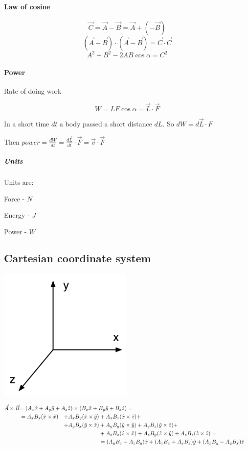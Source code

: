 \paragraph{Law of cosine}
\begin{center}	
	
\end{center}
$$\vec{C} = \vec{A} - \vec{B}=\vec{A} + (-\vec{B})$$
$$(\vec{A}-\vec{B}) \cdot (\vec{A}-\vec{B}) = \vec{C} \cdot \vec{C}$$
$$A^2+B^2-2AB\cos \alpha = C^2$$

\paragraph{Power} Rate of doing work

$$W = LF\cos \alpha = \vec{L} \cdot \vec{F}$$

In a short time $dt$ a body passed a short distance $dL$.
So $dW=d\vec{L} \cdot {F}$

Then $power = \frac{dW}{dt} = \frac{d\vec{L}}{dt} \cdot \vec{F} = \vec{v} \cdot \vec{F}$


\subparagraph{Units} Units are:


Force  - $N$

Energy - $J$

Power -  $W$

\subsection{Cartesian coordinate system}

\begin{center}
	\includegraphics[width=0.2\linewidth]{./lect2/pic2.png}
\end{center}

\begin{align*}
\vec{A} \times \vec{B}  &\mathrlap{= (A_x\hat{x} + A_y\hat{y} + A_z\hat{z})\times (B_x\hat{x} + B_y\hat{y} + B_z\hat{z}) =}\\
&= A_xB_x(\hat{x} \times \hat{x}) &+ A_xB_y(\hat{x} \times \hat{y}) &+ A_xB_z(\hat{x} \times\hat{z})+\\ 
&&+A_yB_x(\hat{y} \times \hat{x}) &+ A_yB_y(\hat{y} \times \hat{y}) + A_yB_z(\hat{y} \times \hat{z}) +\\
&&&+ A_zB_x(\hat{z} \times \hat{x}) + A_zB_y(\hat{z} \times \hat{y}) + A_zB_z(\hat{z} \times \hat{z}) =\\
&&& = (A_yB_z -  A_zB_y)\hat{x}  + (A_zB_x + A_xB_z)\hat{y} + (A_xB_y - A_yB_x)\hat{z}
\end{align*}



